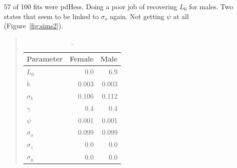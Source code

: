 \documentclass[11pt, a4paper]{article}
\begin{document}
57 of 100 fits were pdHess.  Doing a poor job of recovering $L_0$ for males.
Two states that seem to be linked to $\sigma_o$ again.  Not getting $\psi$ at
all (Figure~\ref{fig:sims2}).
\begin{table}[!htbp]
  \begin{quote}
    \caption{\label{tab:sims2} .} \small{
      \begin{center}
        \begin{tabular}{lrr}
          \hline
          Parameter      & Female & Male\\
          \hline
          $L_0$          & 0.0   & 6.9\\
          $\overline{b}$ & 0.003 & 0.003\\
          $\sigma_b$     & 0.106 & 0.112\\
          $\gamma$       & 0.4   & 0.4\\
          $\psi$         & 0.001 & 0.001\\
          $\sigma_o$     & 0.099 & 0.099\\
          $\sigma_z$     & 0.0   & 0.0\\
          $\sigma_y$     & 0.0   & 0.0\\
          \hline
        \end{tabular}
      \end{center}
    }
  \end{quote}
\end{table}
\end{document}

